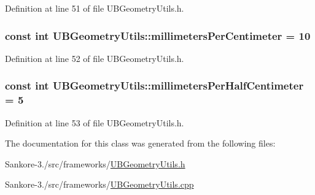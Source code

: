 Definition at line 51 of file U\-B\-Geometry\-Utils.\-h.

\hypertarget{class_u_b_geometry_utils_a88024bb127e395f7eafc59df9bc39f63}{
\subsubsection[{millimeters\-Per\-Centimeter}]{\setlength{\rightskip}{0pt plus 5cm}const int U\-B\-Geometry\-Utils\-::millimeters\-Per\-Centimeter = 10\hspace{0.3cm}{\ttfamily [static]}}}\label{d3/dff/class_u_b_geometry_utils_a88024bb127e395f7eafc59df9bc39f63}


Definition at line 52 of file U\-B\-Geometry\-Utils.\-h.

\hypertarget{class_u_b_geometry_utils_a5169b28d2a1b47f292dbc6d79a1dc8ef}{
\subsubsection[{millimeters\-Per\-Half\-Centimeter}]{\setlength{\rightskip}{0pt plus 5cm}const int U\-B\-Geometry\-Utils\-::millimeters\-Per\-Half\-Centimeter = 5\hspace{0.3cm}{\ttfamily [static]}}}\label{d3/dff/class_u_b_geometry_utils_a5169b28d2a1b47f292dbc6d79a1dc8ef}


Definition at line 53 of file U\-B\-Geometry\-Utils.\-h.



The documentation for this class was generated from the following files\-:\begin{DoxyCompactItemize}
\item 
Sankore-\/3./src/frameworks/\hyperlink{_u_b_geometry_utils_8h}{U\-B\-Geometry\-Utils.\-h}\item 
Sankore-\/3./src/frameworks/\hyperlink{_u_b_geometry_utils_8cpp}{U\-B\-Geometry\-Utils.\-cpp}\end{DoxyCompactItemize}
